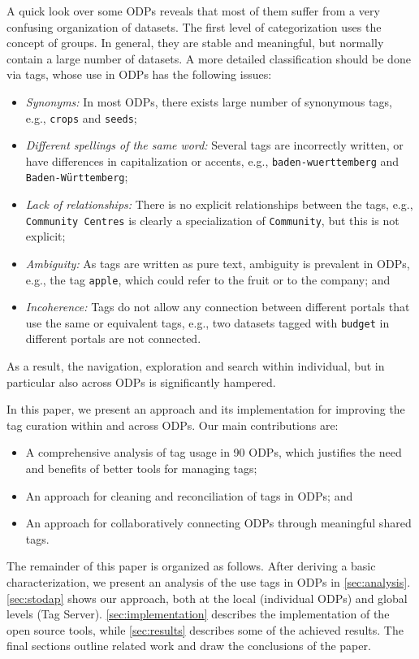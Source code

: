 \documentclass[conference]{IEEEtran}
\begin{document}
A quick look over some ODPs reveals that most of them suffer from a very confusing organization of datasets. 
The first level of categorization uses the concept of groups.
In general, they are stable and meaningful, but normally contain a large number of datasets.
A more detailed classification should be done via tags, whose use in ODPs has the following issues:

\begin{itemize}
	\item \emph{Synonyms:} In most ODPs, there exists large number of synonymous tags, e.g., \texttt{crops} and \texttt{seeds};
	\item \emph{Different spellings of the same word:} Several tags are incorrectly written, or have differences in capitalization or accents, e.g., \texttt{baden-wuerttemberg} and \texttt{Baden-W\"{u}rttemberg};
	\item \emph{Lack of relationships:} There is no explicit relationships between the tags, e.g., \texttt{Community Centres} is clearly a specialization of \texttt{Community}, but this is not explicit;
	\item \emph{Ambiguity:} As tags are written as pure text, ambiguity is prevalent in ODPs, e.g., the tag \texttt{apple}, which could refer to the fruit or to the company; and
	\item \emph{Incoherence:} Tags do not allow any connection between different portals that use the same or equivalent tags, e.g., two datasets tagged with \texttt{budget} in different portals are not connected.
\end{itemize}

As a result, the navigation, exploration and search within individual, but in particular also across ODPs is significantly hampered.

In this paper, we present an approach and its implementation for improving the tag curation within and across ODPs.
Our main contributions are:
\begin{itemize}
	\item A comprehensive analysis of tag usage in 90 ODPs, which justifies the need and benefits of better tools for managing tags;
	\item An approach for cleaning and reconciliation of tags in ODPs; and
	\item An approach for collaboratively connecting ODPs through meaningful shared tags.
\end{itemize}

The remainder of this paper is organized as follows.
After deriving a basic characterization, we present an analysis of the use tags in ODPs in \autoref{sec:analysis}.
\autoref{sec:stodap} shows our approach, both at the local (individual ODPs) and global levels (Tag Server).
\autoref{sec:implementation} describes the implementation of the open source tools, while \autoref{sec:results} describes some of the achieved results.
The final sections outline related work and draw the conclusions of the paper.
\end{document}
